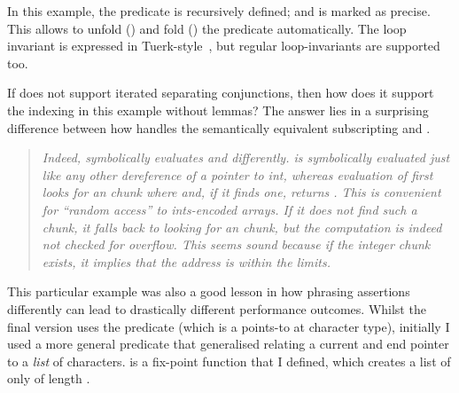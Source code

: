In this example, the  predicate is recursively
defined; and is marked as precise. This allows  to unfold
() and fold () the predicate automatically. The
loop invariant is expressed in Tuerk-style~, but
regular loop-invariants are supported too.


If  does not support iterated separating conjunctions, then how
does it support the indexing in this example without lemmas? The answer lies in
a surprising difference between how  handles the semantically
equivalent subscripting  and . %

\begin{quote}
    \emph{Indeed,  symbolically evaluates  and %
     differently.  is symbolically %
    evaluated just like any other dereference of a pointer to int, whereas
    evaluation of  first looks for an
     chunk where  and, if it %
    finds one, returns . This is convenient for ``random %
    access'' to ints-encoded arrays. If it does not find such a chunk, it falls
    back to looking for an  chunk, but the %
     computation is indeed not checked for overflow. This
    seems sound because if the integer chunk exists, it implies that the
    address is within the limits.}
\end{quote}


This particular example was also a good lesson in how phrasing assertions
differently can lead to drastically different performance outcomes. Whilst the
final version uses the  predicate (which is a points-to at
character type), initially I used a more general  predicate
that generalised  relating a current and end pointer to a
\emph{list} of characters.  is a fix-point %
function that I defined, which creates a list of only  of length
.


